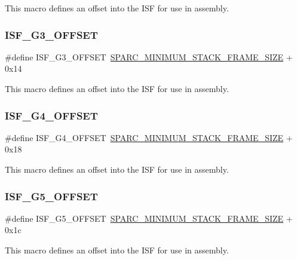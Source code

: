 This macro defines an offset into the I\+SF for use in assembly. \mbox{\label{group__RTEMSScoreCPUSPARC_gaf7d7cbe720eb05ed947bd7c9964242b2}} 
\subsubsection{\texorpdfstring{ISF\_G3\_OFFSET}{ISF\_G3\_OFFSET}}
{\footnotesize\ttfamily \#define I\+S\+F\+\_\+\+G3\+\_\+\+O\+F\+F\+S\+ET~\mbox{\hyperlink{group__RTEMSScoreCPUSPARC_ga8e296685f05588131b26bdc695cb9b8c}{S\+P\+A\+R\+C\+\_\+\+M\+I\+N\+I\+M\+U\+M\+\_\+\+S\+T\+A\+C\+K\+\_\+\+F\+R\+A\+M\+E\+\_\+\+S\+I\+ZE}} + 0x14}

This macro defines an offset into the I\+SF for use in assembly. \mbox{\label{group__RTEMSScoreCPUSPARC_gacecfd76abc0224920501a2ed60f846f1}} 
\subsubsection{\texorpdfstring{ISF\_G4\_OFFSET}{ISF\_G4\_OFFSET}}
{\footnotesize\ttfamily \#define I\+S\+F\+\_\+\+G4\+\_\+\+O\+F\+F\+S\+ET~\mbox{\hyperlink{group__RTEMSScoreCPUSPARC_ga8e296685f05588131b26bdc695cb9b8c}{S\+P\+A\+R\+C\+\_\+\+M\+I\+N\+I\+M\+U\+M\+\_\+\+S\+T\+A\+C\+K\+\_\+\+F\+R\+A\+M\+E\+\_\+\+S\+I\+ZE}} + 0x18}

This macro defines an offset into the I\+SF for use in assembly. \mbox{\label{group__RTEMSScoreCPUSPARC_gafee2800a878c90316a7d05e15b2192ea}} 
\subsubsection{\texorpdfstring{ISF\_G5\_OFFSET}{ISF\_G5\_OFFSET}}
{\footnotesize\ttfamily \#define I\+S\+F\+\_\+\+G5\+\_\+\+O\+F\+F\+S\+ET~\mbox{\hyperlink{group__RTEMSScoreCPUSPARC_ga8e296685f05588131b26bdc695cb9b8c}{S\+P\+A\+R\+C\+\_\+\+M\+I\+N\+I\+M\+U\+M\+\_\+\+S\+T\+A\+C\+K\+\_\+\+F\+R\+A\+M\+E\+\_\+\+S\+I\+ZE}} + 0x1c}

This macro defines an offset into the I\+SF for use in assembly. \mbox{\label{group__RTEMSScoreCPUSPARC_gae10babd83c58bb7da67ad6064557dc7b}} 

